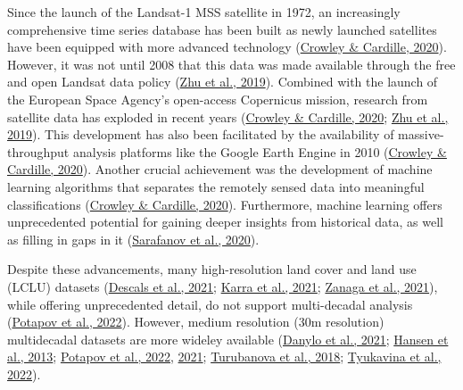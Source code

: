 \documentclass[
  letterpaper,
  DIV=11,
  numbers=noendperiod]{scrreprt}
\begin{document}
Since the launch of the Landsat-1 MSS satellite in 1972, an increasingly
comprehensive time series database has been built as newly launched
satellites have been equipped with more advanced technology
(\protect\hyperlink{ref-crowleyRemoteSensingRecent2020}{Crowley \&
Cardille, 2020}). However, it was not until 2008 that this data was made
available through the free and open Landsat data policy
(\protect\hyperlink{ref-zhuBenefitsFreeOpen2019}{Zhu et al., 2019}).
Combined with the launch of the European Space Agency's open-access
Copernicus mission, research from satellite data has exploded in recent
years (\protect\hyperlink{ref-crowleyRemoteSensingRecent2020}{Crowley \&
Cardille, 2020}; \protect\hyperlink{ref-zhuBenefitsFreeOpen2019}{Zhu et
al., 2019}). This development has also been facilitated by the
availability of massive-throughput analysis platforms like the Google
Earth Engine in 2010
(\protect\hyperlink{ref-crowleyRemoteSensingRecent2020}{Crowley \&
Cardille, 2020}). Another crucial achievement was the development of
machine learning algorithms that separates the remotely sensed data into
meaningful classifications
(\protect\hyperlink{ref-crowleyRemoteSensingRecent2020}{Crowley \&
Cardille, 2020}). Furthermore, machine learning offers unprecedented
potential for gaining deeper insights from historical data, as well as
filling in gaps in it
(\protect\hyperlink{ref-sarafanovMachineLearningApproach2020}{Sarafanov
et al., 2020}).

Despite these advancements, many high-resolution land cover and land use
(LCLU) datasets
(\protect\hyperlink{ref-descalsHighresolutionGlobalMap2021}{Descals et
al., 2021}; \protect\hyperlink{ref-karraGlobalLandUse2021}{Karra et al.,
2021}; \protect\hyperlink{ref-zanagaESAWorldCover102021}{Zanaga et al.,
2021}), while offering unprecedented detail, do not support
multi-decadal analysis
(\protect\hyperlink{ref-potapovGlobal20002020Land2022}{Potapov et al.,
2022}). However, medium resolution (30m resolution) multidecadal
datasets are more wideley available
(\protect\hyperlink{ref-danyloMapExtentYear2021}{Danylo et al., 2021};
\protect\hyperlink{ref-hansenHighResolutionGlobalMaps2013}{Hansen et
al., 2013};
\protect\hyperlink{ref-potapovGlobal20002020Land2022}{Potapov et al.,
2022}, \protect\hyperlink{ref-potapovGlobalMapsCropland2021}{2021};
\protect\hyperlink{ref-turubanovaOngoingPrimaryForest2018}{Turubanova et
al., 2018};
\protect\hyperlink{ref-tyukavinaGlobalTrendsForest2022}{Tyukavina et
al., 2022}).

\end{document}
